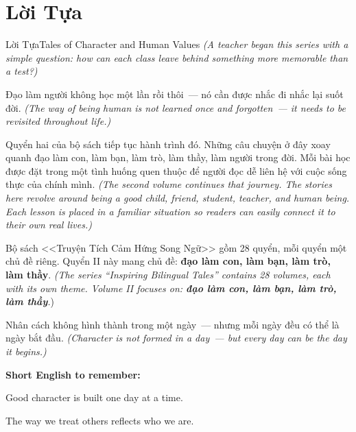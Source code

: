 \chapter*{Lời Tựa}

\begin{truyen}{Lời Tựa}{Tales of Character and Human Values}
\textit{(A teacher began this series with a simple question: how can each class leave behind something more memorable than a test?)}

Đạo làm người không học một lần rồi thôi~--- nó cần được nhắc đi nhắc lại suốt đời.
\textit{(The way of being human is not learned once and forgotten~--- it needs to be revisited throughout life.)}

Quyển hai của bộ sách tiếp tục hành trình đó. Những câu chuyện ở đây xoay quanh đạo làm con, làm bạn, làm trò, làm thầy, làm người trong đời. Mỗi bài học được đặt trong một tình huống quen thuộc để người đọc dễ liên hệ với cuộc sống thực của chính mình.
\textit{(The second volume continues that journey. The stories here revolve around being a good child, friend, student, teacher, and human being. Each lesson is placed in a familiar situation so readers can easily connect it to their own real lives.)}

Bộ sách <<Truyện Tích Cảm Hứng Song Ngữ>> gồm 28 quyển, mỗi quyển một chủ đề riêng. Quyển II này mang chủ đề: \textbf{đạo làm con, làm bạn, làm trò, làm thầy}.
\textit{(The series ``Inspiring Bilingual Tales'' contains 28 volumes, each with its own theme. Volume II focuses on: \textbf{đạo làm con, làm bạn, làm trò, làm thầy}.})
\end{truyen}

\begin{baihoc}
Nhân cách không hình thành trong một ngày~--- nhưng mỗi ngày đều có thể là ngày bắt đầu.
\textit{(Character is not formed in a day~--- but every day can be the day it begins.)}
\end{baihoc}

\begin{ghinhoanh}
\textbf{Short English to remember:}

Good character is built one day at a time.

The way we treat others reflects who we are.
\end{ghinhoanh}

